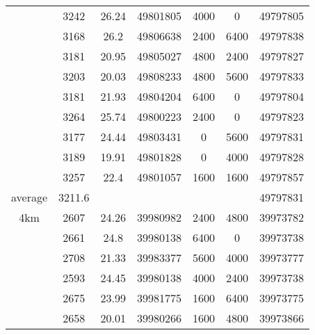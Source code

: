 \documentclass[a4paper,11pt]{article}
\begin{document}
{\begin{center}
\begin{tabular}{|c|c|c|c|c|c|c|}
           &       3242 &      26.24 &   49801805 &       4000 &          0 &   49797805 \\

           &       3168 &       26.2 &   49806638 &       2400 &       6400 &   49797838 \\

           &       3181 &      20.95 &   49805027 &       4800 &       2400 &   49797827 \\

           &       3203 &      20.03 &   49808233 &       4800 &       5600 &   49797833 \\

           &       3181 &      21.93 &   49804204 &       6400 &          0 &   49797804 \\

           &       3264 &      25.74 &   49800223 &       2400 &          0 &   49797823 \\

           &       3177 &      24.44 &   49803431 &          0 &       5600 &   49797831 \\

           &       3189 &      19.91 &   49801828 &          0 &       4000 &   49797828 \\

           &       3257 &       22.4 &   49801057 &       1600 &       1600 &   49797857 \\
\hline %
   average &     3211.6 &            &            &            &            &   49797831 \\
\hline %
       4km &       2607 &      24.26 &   39980982 &       2400 &       4800 &   39973782 \\

           &       2661 &       24.8 &   39980138 &       6400 &          0 &   39973738 \\

           &       2708 &      21.33 &   39983377 &       5600 &       4000 &   39973777 \\

           &       2593 &      24.45 &   39980138 &       4000 &       2400 &   39973738 \\

           &       2675 &      23.99 &   39981775 &       1600 &       6400 &   39973775 \\

           &       2658 &      20.01 &   39980266 &       1600 &       4800 &   39973866 \\


\end{tabular}
\end{center}}
\end{document}
